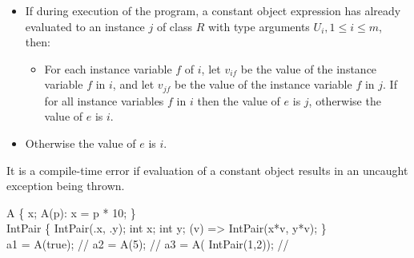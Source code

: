 \documentclass[makeidx]{article}
\begin{document}
{\begin{itemize}
\item If during execution of the program,
  a constant object expression has already evaluated to
  an instance $j$ of class $R$ with type arguments $U_i, 1 \le i \le m$, then:

  \begin{itemize}
  \item For each instance variable $f$ of $i$,
    let $v_{if}$ be the value of the instance variable $f$ in $i$, and
    let $v_{jf}$ be the value of the instance variable $f$ in $j$.
    If 
    for all instance variables $f$ in $i$
    then the value of $e$ is $j$,
    otherwise the value of $e$ is $i$.
  \end{itemize}
\item Otherwise the value of $e$ is $i$.
\end{itemize}


\LMHash{}%
It is a compile-time error if evaluation of a constant object
results in an uncaught exception being thrown.


\begin{dartCode}
\CLASS{} A \{
  \FINAL{} x;
  \CONST{} A(p): x = p * 10;
\}
\\
\CLASS{} IntPair \{
  \CONST{} IntPair(\THIS.x, \THIS.y);
  \FINAL{} int x;
  \FINAL{} int y;
  \OPERATOR *(v) => \NEW{} IntPair(x*v, y*v);
\}
\\
\CONST a1 = \CONST{} A(true); // 
\CONST a2 = \CONST{} A(5); // 
\CONST a3 = \CONST{} A(\CONST{} IntPair(1,2)); // 
\end{dartCode}

}
\end{document}
